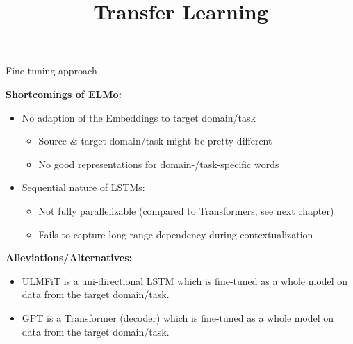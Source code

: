 



\newcommand{\titlefigure}{figure/ulmfit_sq.png}
\newcommand{\learninggoals}{
\item Understand the paradigm of fine-tuning for Transfer Learning
\item Get the intuition of the subtleties of training ULMFiT}

\title{Transfer Learning}
\date{}




\begin{vbframe}{Fine-tuning approach}

\vfill

\textbf{Shortcomings of ELMo:}

	\begin{itemize}
		\item No adaption of the Embeddings to target domain/task
			\begin{itemize}
				\item Source \& target domain/task might be pretty different
				\item No good representations for domain-/task-specific words
			\end{itemize}
		\item Sequential nature of LSTMs:
			\begin{itemize}
				\item Not fully parallelizable (compared to Transformers, see next chapter)
				\item Fails to capture long-range dependency during contextualization
			\end{itemize}
	\end{itemize}

	\vspace{.3cm}
	
	\textbf{Alleviations/Alternatives:}

	\begin{itemize}
		\item ULMFiT \href{https://www.aclweb.org/anthology/P18-1031.pdf}{} is a uni-directional LSTM which is fine-tuned as a whole model on data from the target domain/task.
		\item GPT \href{https://s3-us-west-2.amazonaws.com/openai-assets/research-covers/language-unsupervised/language_understanding_paper.pdf}{} is a Transformer (decoder) which is fine-tuned as a whole model on data from the target domain/task.
	\end{itemize}
	
\vfill

\end{vbframe}

